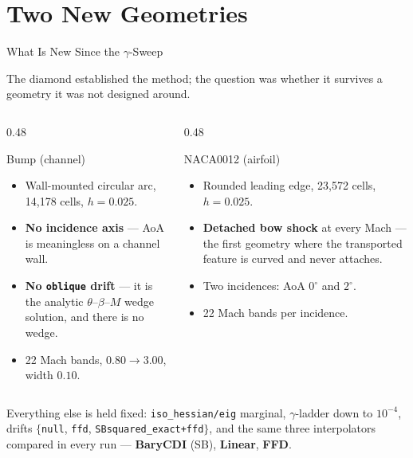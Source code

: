 \documentclass[aspectratio=169]{beamer}
\begin{document}
\section{Two New Geometries}

\begin{frame}{What Is New Since the $\gamma$-Sweep}

The diamond established the method; the question was whether it survives a
geometry it was not designed around.

\begin{columns}[T]
\begin{column}{0.48\textwidth}
\begin{block}{Bump (channel)}
\begin{itemize}\small
    \item Wall-mounted circular arc, 14{,}178 cells, $h=0.025$.
    \item \textbf{No incidence axis} — AoA is meaningless on a channel wall.
    \item \textbf{No \texttt{oblique} drift} — it is the analytic $\theta$--$\beta$--$M$
          wedge solution, and there is no wedge.
    \item 22 Mach bands, $0.80\to3.00$, width $0.10$.
\end{itemize}
\end{block}
\end{column}
\begin{column}{0.48\textwidth}
\begin{block}{NACA0012 (airfoil)}
\begin{itemize}\small
    \item Rounded leading edge, 23{,}572 cells, $h=0.025$.
    \item \textbf{Detached bow shock} at every Mach — the first geometry where
          the transported feature is curved and never attaches.
    \item Two incidences: AoA $0^\circ$ and $2^\circ$.
    \item 22 Mach bands per incidence.
\end{itemize}
\end{block}
\end{column}
\end{columns}

\vspace{0.5em}
Everything else is held fixed: \texttt{iso\_hessian/eig} marginal,
$\gamma$-ladder down to $10^{-4}$, drifts $\{$\texttt{null}, \texttt{ffd},
\texttt{SBsquared\_exact+ffd}$\}$, and the same three interpolators compared in
every run — \textbf{BaryCDI} (SB), \textbf{Linear}, \textbf{FFD}.

\end{frame}
\end{document}
